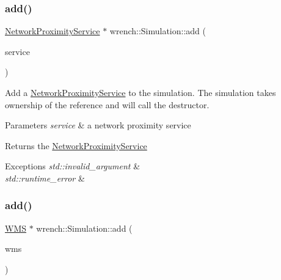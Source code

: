 \subsubsection{\texorpdfstring{add()}{add()}\hspace{0.1cm}{\footnotesize\ttfamily [3/5]}}
{\footnotesize\ttfamily \hyperlink{classwrench_1_1_network_proximity_service}{Network\+Proximity\+Service} $\ast$ wrench\+::\+Simulation\+::add (\begin{DoxyParamCaption}\item[{\hyperlink{classwrench_1_1_network_proximity_service}{Network\+Proximity\+Service} $\ast$}]{service }\end{DoxyParamCaption})}



Add a \hyperlink{classwrench_1_1_network_proximity_service}{Network\+Proximity\+Service} to the simulation. The simulation takes ownership of the reference and will call the destructor. 


\begin{DoxyParams}{Parameters}
{\em service} & a network proximity service\\
\hline
\end{DoxyParams}
\begin{DoxyReturn}{Returns}
the \hyperlink{classwrench_1_1_network_proximity_service}{Network\+Proximity\+Service}
\end{DoxyReturn}

\begin{DoxyExceptions}{Exceptions}
{\em std\+::invalid\+\_\+argument} & \\
\hline
{\em std\+::runtime\+\_\+error} & \\
\hline
\end{DoxyExceptions}
\mbox{\label{classwrench_1_1_simulation_ad79637ec3d0d4b17c9ab4b78104ef27e}} 
\subsubsection{\texorpdfstring{add()}{add()}\hspace{0.1cm}{\footnotesize\ttfamily [4/5]}}
{\footnotesize\ttfamily \hyperlink{classwrench_1_1_w_m_s}{W\+MS} $\ast$ wrench\+::\+Simulation\+::add (\begin{DoxyParamCaption}\item[{\hyperlink{classwrench_1_1_w_m_s}{W\+MS} $\ast$}]{wms }\end{DoxyParamCaption})}



